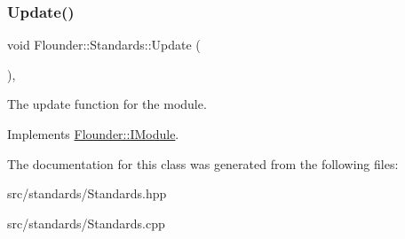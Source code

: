 \subsubsection{\texorpdfstring{Update()}{Update()}}
{\footnotesize\ttfamily void Flounder\+::\+Standards\+::\+Update (\begin{DoxyParamCaption}{ }\end{DoxyParamCaption})\hspace{0.3cm}{\ttfamily [override]}, {\ttfamily [virtual]}}



The update function for the module. 



Implements \hyperlink{class_flounder_1_1_i_module_a1812bb03a6990e4698a10c043fa25fde}{Flounder\+::\+I\+Module}.



The documentation for this class was generated from the following files\+:\begin{DoxyCompactItemize}
\item 
src/standards/Standards.\+hpp\item 
src/standards/Standards.\+cpp\end{DoxyCompactItemize}
